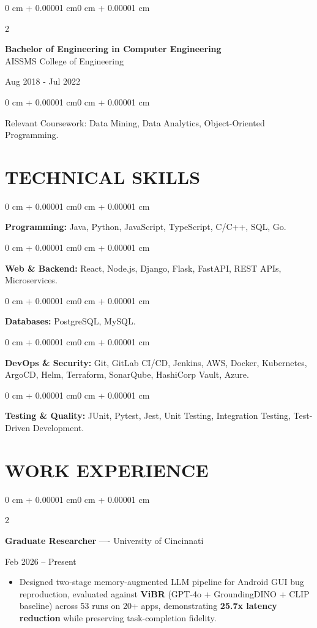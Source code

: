 \documentclass[10pt, letterpaper]{article}
\newenvironment{highlights}{
    \begin{itemize}[
        topsep=0.10 cm,
        parsep=0.06 cm,
        partopsep=0pt,
        itemsep=0.06 cm,
        leftmargin=12pt
    ]
}{
    \end{itemize}
}
\newenvironment{onecolentry}{
    \begin{adjustwidth}{0 cm + 0.00001 cm}{0 cm + 0.00001 cm}
}{
    \end{adjustwidth}
}
\newenvironment{twocolentry}[2][]{
    \onecolentry
    \def\secondColumn{#2}
    \setcolumnwidth{\fill, 4.5 cm}
    \begin{paracol}{2}
}{
    \switchcolumn \raggedleft \secondColumn
    \end{paracol}
    \endonecolentry
}
\begin{document}
\begin{twocolentry}{
    Aug 2018 - Jul 2022
}
    \textbf{Bachelor of Engineering in Computer Engineering} \\
    AISSMS College of Engineering
\end{twocolentry}
\begin{onecolentry}
Relevant Coursework: Data Mining, Data Analytics, Object-Oriented Programming.
\end{onecolentry}
\section{TECHNICAL SKILLS}
\begin{onecolentry}
\textbf{Programming:} Java, Python, JavaScript, TypeScript, C/C++, SQL, Go.
\end{onecolentry}
\vspace{0.06 cm}
\begin{onecolentry}
\textbf{Web \& Backend:} React, Node.js, Django, Flask, FastAPI, REST APIs, Microservices.
\end{onecolentry}
\vspace{0.06 cm}
\begin{onecolentry}
\textbf{Databases:} PostgreSQL, MySQL.
\end{onecolentry}
\vspace{0.06 cm}
\begin{onecolentry}
\textbf{DevOps \& Security:} Git, GitLab CI/CD, Jenkins, AWS, Docker, Kubernetes, ArgoCD, Helm, Terraform, SonarQube, HashiCorp Vault, Azure.
\end{onecolentry}
\vspace{0.06 cm}
\begin{onecolentry}
\textbf{Testing \& Quality:} JUnit, Pytest, Jest, Unit Testing, Integration Testing, Test-Driven Development.
\end{onecolentry}

\section{WORK EXPERIENCE}
\begin{twocolentry}{Feb 2026 -- Present}
\textbf{Graduate Researcher} ---- University of Cincinnati
\end{twocolentry}
\begin{highlights}
  \item Designed two-stage memory-augmented LLM pipeline for Android GUI bug reproduction, evaluated against \textbf{ViBR} (GPT-4o + GroundingDINO + CLIP baseline) across 53 runs on 20+ apps, demonstrating \textbf{25.7x latency reduction} while preserving task-completion fidelity.
\end{highlights}
\end{document}
